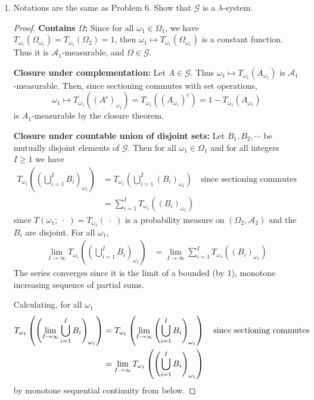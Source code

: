 \documentclass[letterpaper, 12pt]{article}
\newcommand{\cA}{\mathcal{A}}
\newcommand{\sG}{\mathscr{G}}
\begin{document}
\begin{enumerate}
\item
Notations are the same as Problem 6. Show that $\sG$ is a $\lambda$-system.
\begin{proof}
\textbf{Contains $\Omega$:} Since for all $\omega_1 \in \Omega_1$, we have $T_{\omega_1}(\Omega_{\omega_1}) = T_{\omega_1}(\Omega_2) = 1$, then $\omega_1\mapsto T_{\omega_1}(\Omega_{\omega_1})$ is a constant function. Thus it is $\cA_1$-measurable, and $\Omega \in \sG$.

\textbf{Closure under complementation:} Let $A \in \sG$. Thus $\omega_1\mapsto T_{\omega_1}(A_{\omega_1})$ is $\cA_1$-measurable. Then, since sectioning commutes with set operations, 
\[
\omega_1 \mapsto T_{\omega_1} ((A^c)_{\omega_1}) = T_{\omega_1}((A_{\omega_1})^c) = 1 - T_{\omega_1} (A_{\omega_1})
\]
is $A_1$-measurable by the closure theorem.

\textbf{Closure under countable union of disjoint sets: } Let $B_1, B_2, \cdots$ be mutually disjoint elements of $\sG$. Then for all $\omega_1 \in \Omega_1$ and for all integers $I \geq 1$ we have
\begin{align*}
T_{\omega_1} 
\left(
\left( 
\bigcup_{i = 1}^I B_i
\right)_{\omega_1} 
\right) 
&= T_{\omega_1}
\left(
\bigcup_{i=1}^I (B_i)_{\omega_1} 
\right) 
\quad \text{since sectioning commutes}
\\
&=
\sum_{i=1}^I
T_{\omega_1}
\left(
(B_i)_{\omega_1} 
\right) 
\end{align*}
since $T(\omega_1;\;\cdot\;) = T_{\omega_1}(\;\cdot\;)$ is a probability measure on $(\Omega_2,\cA_2)$ and the $B_i$ are disjoint. For all $\omega_1$,
\begin{align}
\lim_{I \to \infty}
T_{\omega_1} 
\left(
\left( 
\bigcup_{i = 1}^I B_i
\right)_{\omega_1} 
\right) 
&=
\lim_{I \to \infty}
\sum_{i=1}^I
T_{\omega_1}
\left(
(B_i)_{\omega_1} 
\right) 
\label{pt1}
\end{align}
The series
converges since it is the limit of a bounded (by 1), monotone increasing sequence of partial sums.

Calculating, for all $\omega_1$
\begin{align}
T_{\omega_1}
\left(
\left(
\lim_{I \to \infty}
\bigcup_{i=1}^I B_i
\right)
_{\omega_1}
\right)
&=
T_{\omega_1}
\left(
\lim_{I \to \infty}
\left(
\bigcup_{i=1}^I B_i
\right)
_{\omega_1}
\right)
\quad\text{since sectioning commutes}
\notag
\\
&=
\lim_{I \to \infty}
T_{\omega_1} 
\left(
\left( 
\bigcup_{i = 1}^I B_i
\right)_{\omega_1} 
\right) 
\label{pt2}
\end{align}
by monotone sequential continuity from below.


\end{proof}
\end{enumerate}
\end{document}
